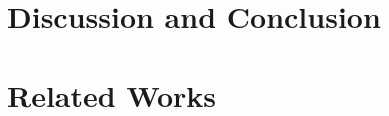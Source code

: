 \documentclass[11pt,a4paper]{article}
\begin{document}
\iffalse
\section{Analysis}

\fi

\section{Discussion and Conclusion}


\section{Related Works}


\clearpage



\appendix
\label{sec:detailedresults}


\end{document}
